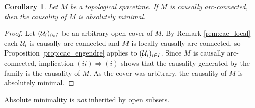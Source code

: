 \documentclass[a4paper,twoside]{article}
\newtheorem{cor}[lem]{Corollary}
\begin{document}
\begin{cor}\label{cor:causalement_connexe_minimal}
Let $M$ be a topological spacetime. If $M$ is causally arc-connected, then the causality of $M$ is absolutely minimal.
\end{cor}
\begin{proof}
Let $(\mathcal{U}_i)_{i\in I}$ be an arbitrary open cover of $M$. By Remark \ref{rem:cac_local} each
$\mathcal{U}_i$ is causally arc-connected and $M$ is locally causally arc-connected, so Proposition
\ref{prop:cac_engendre} applies to $(\mathcal{U}_i)_{i\in I}$. Since $M$ is causally arc-connected,
implication $(ii)\Rightarrow(i)$ shows that the causality generated by the family is the
causality of $M$. As the cover was arbitrary, the causality of $M$ is absolutely minimal.
\end{proof}

Absolute minimality is \emph{not} inherited by open subsets.
\end{document}
